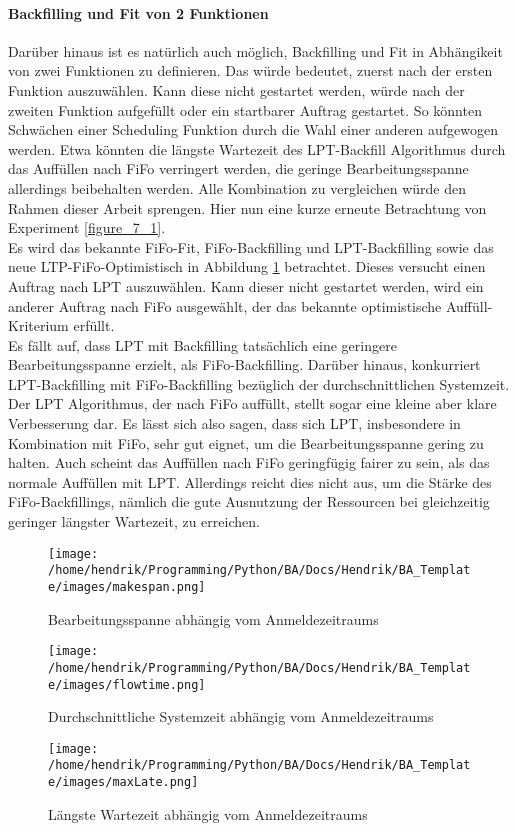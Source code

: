 \paragraph{Backfilling und Fit von 2 Funktionen} Darüber hinaus ist es natürlich auch möglich, Backfilling und Fit in Abhängikeit von zwei Funktionen zu definieren. Das würde bedeutet, zuerst nach der ersten Funktion auszuwählen. Kann diese nicht gestartet werden, würde nach der zweiten Funktion aufgefüllt oder ein startbarer Auftrag gestartet. So könnten Schwächen einer Scheduling Funktion durch die Wahl einer anderen aufgewogen werden. Etwa könnten die längste Wartezeit des LPT-Backfill Algorithmus durch das Auffüllen nach FiFo verringert werden, die geringe Bearbeitungsspanne allerdings beibehalten werden. Alle Kombination zu vergleichen würde den Rahmen dieser Arbeit sprengen. Hier nun eine kurze erneute Betrachtung von Experiment \ref{figure_7_1}.\\
Es wird das bekannte FiFo-Fit, FiFo-Backfilling und LPT-Backfilling sowie das neue LTP-FiFo-Optimistisch in Abbildung \ref{figure_makespan} betrachtet. Dieses versucht einen Auftrag nach LPT auszuwählen. Kann dieser nicht gestartet werden, wird ein anderer Auftrag nach FiFo ausgewählt, der das bekannte optimistische Auffüll-Kriterium erfüllt.\\
Es fällt auf, dass LPT mit Backfilling tatsächlich eine geringere Bearbeitungsspanne erzielt, als FiFo-Backfilling. Darüber hinaus, konkurriert LPT-Backfilling mit FiFo-Backfilling bezüglich der durchschnittlichen Systemzeit. Der LPT Algorithmus, der nach FiFo auffüllt, stellt sogar eine kleine aber klare Verbesserung dar. Es lässt sich also sagen, dass sich LPT, insbesondere in Kombination mit FiFo, sehr gut eignet, um die Bearbeitungsspanne gering zu halten. Auch scheint das Auffüllen nach FiFo geringfügig fairer zu sein, als das normale Auffüllen mit LPT. Allerdings reicht dies nicht aus, um die Stärke des FiFo-Backfillings, nämlich die gute Ausnutzung der Ressourcen bei gleichzeitig geringer längster Wartezeit, zu erreichen.
\begin{figure}	
	\texttt{[image: /home/hendrik/Programming/Python/BA/Docs/Hendrik/BA\_Template/images/makespan.png]}
	\caption{Bearbeitungsspanne abhängig vom Anmeldezeitraums}
	\label{figure_makespan}
\end{figure}
\begin{figure}	
	\texttt{[image: /home/hendrik/Programming/Python/BA/Docs/Hendrik/BA\_Template/images/flowtime.png]}
	\caption{Durchschnittliche Systemzeit abhängig vom Anmeldezeitraums}
	\label{figure_flowtime}
\end{figure}
\begin{figure}	
	\texttt{[image: /home/hendrik/Programming/Python/BA/Docs/Hendrik/BA\_Template/images/maxLate.png]}
	\caption{Längste Wartezeit abhängig vom Anmeldezeitraums}
	\label{figure_maxLate}
\end{figure}

